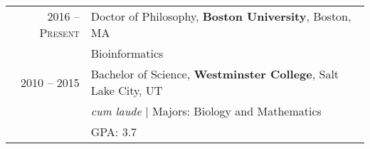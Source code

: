 \documentclass[a4paper,10pt]{article}
\begin{document}
\section{\color{linkcolour}{Education}}
\begin{tabular}{rl}
\textsc{2016 -- Present} & Doctor of Philosophy, \textbf{Boston University}, Boston, MA \\
& Bioinformatics \\

 \textsc{2010 -- 2015} & Bachelor of Science, \textbf{Westminster College}, Salt Lake City, UT\\
& \small\emph{cum laude} | Majors: Biology and Mathematics\\
&\normalsize \textsc{GPA}: 3.7
\end{tabular}

\end{document}
